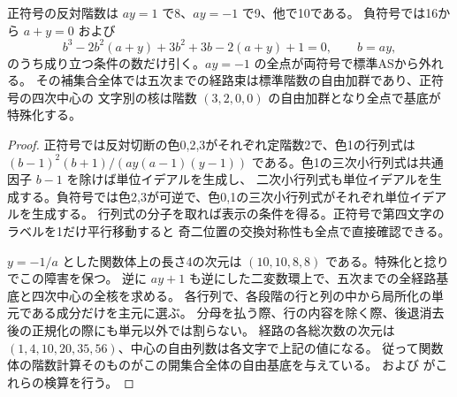\begin{proposition}\label{prop:parallel-surface-ranks-centers}
正符号の反対階数は $ay=1$ で8、$ay=-1$ で9、他で10である。
負符号では16から $a+y=0$ および
\[
 b^3-2b^2(a+y)+3b^2+3b-2(a+y)+1=0,\qquad b=ay,
\]
のうち成り立つ条件の数だけ引く。$ay=-1$ の全点が両符号で標準ASから外れる。
その補集合全体では五次までの経路束は標準階数の自由加群であり、正符号の四次中心の
文字別の核は階数 $(3,2,0,0)$ の自由加群となり全点で基底が特殊化する。
\end{proposition}
\begin{proof}
正符号では反対切断の色0,2,3がそれぞれ定階数2で、色1の行列式は
$(b-1)^2(b+1)/(ay(a-1)(y-1))$ である。色1の三次小行列式は共通因子 $b-1$ を除けば単位イデアルを生成し、
二次小行列式も単位イデアルを生成する。負符号では色2,3が可逆で、色0,1の三次小行列式がそれぞれ単位イデアルを生成する。
行列式の分子を取れば表示の条件を得る。正符号で第四文字のラベルを1だけ平行移動すると
奇二位置の交換対称性も全点で直接確認できる。

$y=-1/a$ とした関数体上の長さ4の次元は $(10,10,8,8)$ である。特殊化と捻りでこの障害を保つ。
逆に $ay+1$ も逆にした二変数環上で、五次までの全経路基底と四次中心の全核を求める。
各行列で、各段階の行と列の中から局所化の単元である成分だけを主元に選ぶ。
分母を払う際、行の内容を除く際、後退消去後の正規化の際にも単元以外では割らない。
経路の各総次数の次元は $(1,4,10,20,35,56)$、中心の自由列数は各文字で上記の値になる。
従って関数体の階数計算そのものがこの開集合全体の自由基底を与えている。
 および
 がこれらの検算を行う。
\end{proof}
